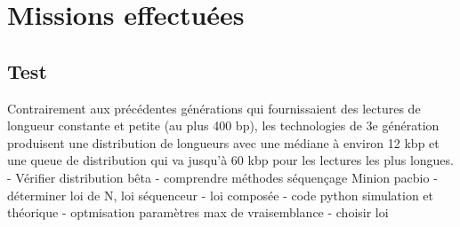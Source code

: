 \documentclass[12pt,a4paper]{article} %
\begin{document}
\section{Missions effectuées} \subsection{Test}
Contrairement aux précédentes générations qui fournissaient des lectures
de longueur constante et petite (au plus 400 bp), les technologies de 3e
génération produisent une distribution de longueurs avec une médiane à
environ 12 kbp et une queue de distribution qui va jusqu'à 60 kbp pour les
lectures les plus longues.
- Vérifier distribution bêta
- comprendre méthodes séquençage Minion pacbio
- déterminer loi de N, loi séquenceur
- loi composée
- code python simulation et théorique
- optmisation paramètres max de vraisemblance
- choisir loi
\end{document}
